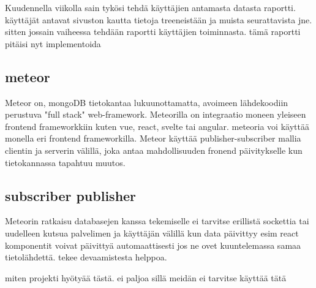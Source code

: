 
Kuudennella viikolla sain tykösi tehdä käyttäjien antamasta datasta raportti.
käyttäjät antavat sivuston kautta tietoja treeneistään ja muista seurattavista jne. sitten jossain vaiheessa tehdään raportti käyttäjien toiminnasta.
tämä raportti pitäisi nyt implementoida


\subsection*{meteor}

Meteor on, mongoDB tietokantaa lukuunottamatta, avoimeen lähdekoodiin perustuva "full stack" web-framework. Meteorilla on integraatio moneen yleiseen frontend frameworkkiin kuten vue, react, svelte tai angular.
meteoria voi käyttää monella eri frontend frameworkilla.
Meteor käyttää publisher-subscriber mallia clientin ja serverin välillä, joka antaa mahdollisuuden fronend päivitykselle kun tietokannassa tapahtuu muutos.



\medskip


\subsection*{subscriber publisher}

Meteorin ratkaisu databasejen kanssa tekemiselle ei tarvitse erillistä sockettia tai uudelleen kutsua palvelimen ja käyttäjän välillä kun data päivittyy
esim react komponentit voivat päivittyä automaattisesti jos ne ovet kuuntelemassa samaa tietolähdettä.
tekee devaamistesta helppoa.

miten projekti hyötyää tästä. ei paljoa sillä meidän ei tarvitse käyttää tätä
\medskip



